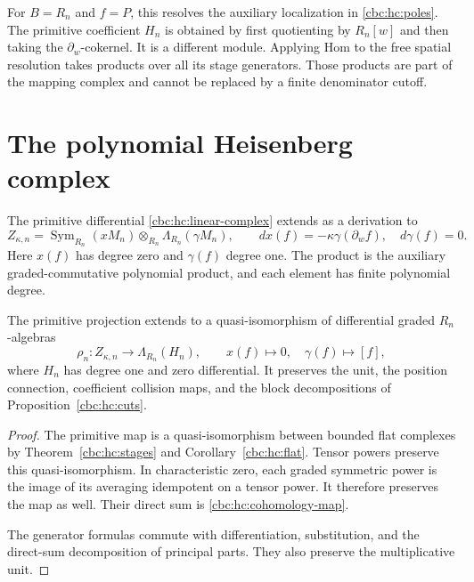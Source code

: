 For $B=R_n$ and $f=P$, this resolves the auxiliary localization
in \eqref{cbc:hc:poles}. The primitive coefficient $H_n$ is
obtained by first quotienting by $R_n[w]$ and then taking
the $\partial_w$-cokernel. It is a different module.
Applying Hom to the free spatial resolution takes products
over all its stage generators. Those products are part of
the mapping complex and cannot be replaced by a finite
denominator cutoff.

\section{The polynomial Heisenberg complex}
\label{cbc:hc:polynomial}

The primitive differential \eqref{cbc:hc:linear-complex}
extends as a derivation to
\begin{equation}\label{cbc:hc:polynomial-complex}
 Z_{\kappa,n}=\operatorname{Sym}_{R_n}(xM_n)
      \otimes_{R_n}\Lambda_{R_n}(\gamma M_n),\qquad
 dx(f)=-\kappa\gamma(\partial_wf),\quad d\gamma(f)=0.
\end{equation}
Here $x(f)$ has degree zero and $\gamma(f)$ degree one.
The product is the auxiliary graded-commutative polynomial
product, and each element has finite polynomial degree.

\begin{theorem}\label{cbc:hc:polynomial-cohomology}
The primitive projection extends to a quasi-isomorphism
of differential graded $R_n$-algebras
\begin{equation}\label{cbc:hc:cohomology-map}
 \rho_n:Z_{\kappa,n}\longrightarrow\Lambda_{R_n}(H_n),
 \qquad x(f)\longmapsto0,\quad\gamma(f)\longmapsto[f],
\end{equation}
where $H_n$ has degree one and zero differential.
It preserves the unit, the position connection, coefficient
collision maps, and the block decompositions of
Proposition~\ref{cbc:hc:cuts}.
\end{theorem}

\begin{proof}
The primitive map is a quasi-isomorphism between bounded
flat complexes by Theorem~\ref{cbc:hc:stages} and
Corollary~\ref{cbc:hc:flat}. Tensor powers preserve this
quasi-isomorphism. In characteristic zero, each graded
symmetric power is the image of its averaging idempotent
on a tensor power. It therefore preserves the map as well.
Their direct sum is \eqref{cbc:hc:cohomology-map}.

The generator formulas commute with differentiation,
substitution, and the direct-sum decomposition of principal
parts. They also preserve the multiplicative unit.
\end{proof}

